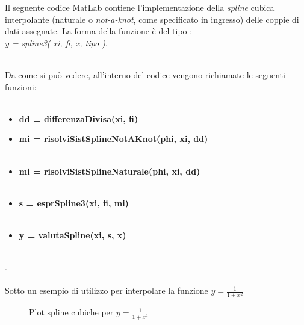 Il seguente codice MatLab contiene l'implementazione della \textit{spline} cubica interpolante (naturale o \textit{not-a-knot}, come specificato in ingresso) delle coppie di dati assegnate. La forma della funzione è del tipo :\\ \textit{y = spline3( xi, fi, x, tipo )}.\\\

Da come si può vedere, all'interno del codice vengono richiamate le seguenti funzioni:\\\ 
\begin{itemize}
	\item \textbf{dd = differenzaDivisa(xi, fi)}
	      
	\item \textbf{mi = risolviSistSplineNotAKnot(phi, xi, dd)}\\\
	      
	\item \textbf{mi = risolviSistSplineNaturale(phi, xi, dd)}\\\
	      
	\item \textbf{s = esprSpline3(xi, fi, mi)}\\\
	      
	\item \textbf{y = valutaSpline(xi, s, x)}\\\
	      
\end{itemize}

. \\ \\ Sotto un esempio di utilizzo per interpolare la funzione $y = \frac{1}{1+x^2}$ 



\begin{figure}[!ht]
	\caption{Plot spline cubiche per $y = \frac{1}{1+x^2}$ }\label{fig:Cap_4_Es_5}
\end{figure}
